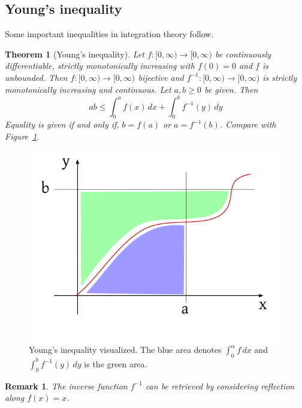 \documentclass{article}
\newtheorem{theorem}{Theorem}  \numberwithin{theorem}{section}
\newtheorem{remark}{Remark}  \numberwithin{remark}{section}
\begin{document}
\subsection{Young's inequality}

Some important inequalities in integration theory follow.

\begin{theorem}[Young's inequality] %
  Let $f: [0, \infty) \to [0,\infty)$ be continuously differentiable, strictly monotonically increasing with $f(0) = 0$ and $f$ is unbounded.
  Then $f: [0, \infty) \to [0,\infty)$ bijective and $f^{-1}: [0,\infty) \to [0,\infty)$ is strictly monotonically increasing and continuous.
  Let $a, b \geq 0$ be given. Then
  \[ ab \leq \int_0^a f(x) \, dx + \int_0^b f^{-1}(y) \, dy \]
  Equality is given if and only if, $b = f(a)$ or $a = f^{-1}(b)$.
  Compare with Figure~\ref{img:young}.
\end{theorem}

\begin{figure}[t]
  \begin{center}
    \includegraphics{img/23_young.pdf}
    \caption{Young's inequality visualized. The blue area denotes $\int_0^\alpha f \, dx$ and $\int_0^b f^{-1}(y) \, dy$ is the green area.}
    \label{img:young}
  \end{center}
\end{figure}

\begin{remark}
  The inverse function $f^{-1}$ can be retrieved by considering reflection along $f(x) = x$.
\end{remark}
\end{document}
